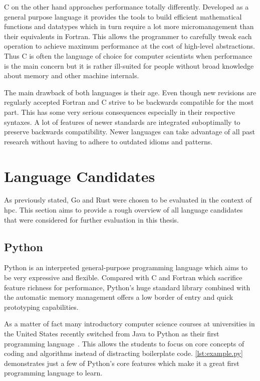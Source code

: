 C on the other hand approaches performance totally differently. Developed as a general purpose language it provides the tools to build efficient mathematical functions and datatypes which in turn require a lot more micromanagement than their equivalents in Fortran. This allows the programmer to carefully tweak each operation to achieve maximum performance at the cost of high-level abstractions. Thus C is often the language of choice for computer scientists when performance is the main concern but it is rather ill-suited for people without broad knowledge about memory and other machine internals.

The main drawback of both languages is their age. Even though new revisions are regularly accepted Fortran and C strive to be backwards compatible for the most part. This has some very serious consequences especially in their respective syntaxes. A lot of features of newer standards are integrated suboptimally to preserve backwards compatibility. Newer languages can take advantage of all past research without having to adhere to outdated idioms and patterns.

\section{Language Candidates}
\label{sec:State_of_the_art::Candidates}

As previously stated, Go and Rust were chosen to be evaluated in the context of \gls{hpc}. This section aims to provide a rough overview of all language candidates that were considered for further evaluation in this thesis.

\subsection*{Python}
\label{subsec:State_of_the_art::Candidates::Python}

Python is an interpreted general-purpose programming language which aims to be very expressive and flexible. Compared with C and Fortran which sacrifice feature richness for performance, Python's huge standard library combined with the automatic memory management offers a low border of entry and quick prototyping capabilities.

As a matter of fact many introductory computer science courses at universities in the United States recently switched from Java to Python as their first programming language~\cite{GUO14, intro_py}. This allows the students to focus on core concepts of coding and algorithms instead of distracting boilerplate code. \autoref{lst:example.py} demonstrates just a few of Python's core features which make it a great first programming language to learn.
\\



